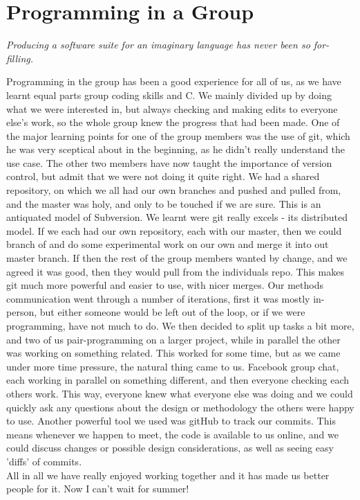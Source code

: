\documentclass[a5=4paper,12pt]{article}
\begin{document}
\section*{Programming in a Group}
\begin{center}\textit{Producing a software suite for an imaginary language has never been so for-filling.} \end{center}
Programming in the group has been a good experience for all of us, as we have learnt equal parts group coding skills and C. We mainly divided up by doing what we were interested in, but always checking and making edits to everyone else's work, so the whole group knew the progress that had been made. One of the major learning points for one of the group members was the use of git, which he was very sceptical about in the beginning, as he didn't really understand the use case. The other two members have now taught the importance of version control, but admit that we were not doing it quite right. We had a shared repository, on which we all had our own branches and pushed and pulled from, and the master was holy, and only to be touched if we are sure. This is an antiquated model of Subversion. We learnt were git really excels -  its distributed model. If we each had our own repository, each with our master, then we could branch of and do some experimental work on our own and merge it into out master branch. If then the rest of the group members wanted by change, and we agreed it was good, then they would pull from the individuals repo. This makes git much more powerful and easier to use, with nicer merges. Our methods communication went through a number of iterations, first it was mostly in-person, but either someone would be left out of the loop, or if we were programming, have not much to do. We then decided to split up tasks a bit more, and two of us pair-programming on a larger project, while in parallel the other was working on something related. This worked for some time, but as we came under more time pressure, the natural thing came to us. Facebook group chat, each working in parallel on something different, and then everyone checking each others work. This way, everyone knew what everyone else was doing and we could quickly ask any questions about the design or methodology the others were happy to use. Another powerful tool we used was gitHub to track our commits. This means whenever we happen to meet, the code is available to us online, and we could discuss changes or possible design considerations, as well as seeing easy 'diffs' of commits.\\
All in all we have really enjoyed working together and it has made us better people for it. Now I can't wait for summer!
\end{document}
